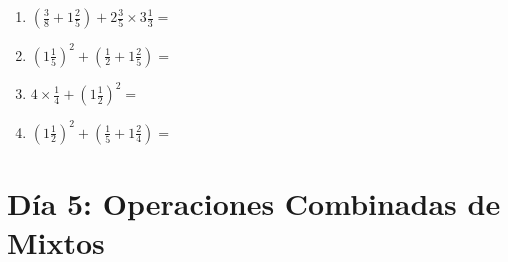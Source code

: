 \documentclass[12pt]{article}
\begin{document}
\begin{enumerate}
\item \large $ (\frac{3}{8} + 1 \frac{2}{5}) + 2 \frac{3}{5} \times 3 \frac{1}{3} = $ \vspace{1.8cm}
\item \large $ (1 \frac{1}{5})^2 + (\frac{1}{2} + 1 \frac{2}{5}) = $ \vspace{1.8cm}
\item \large $ 4 \times \frac{1}{4} + (1 \frac{1}{2})^2 = $ \vspace{1.8cm}
\item \large $ (1 \frac{1}{2})^2 + (\frac{1}{5} + 1 \frac{2}{4}) = $ \vspace{1.8cm}
\end{enumerate}\newpage
\section*{Día 5: Operaciones Combinadas de Mixtos}
\end{document}
